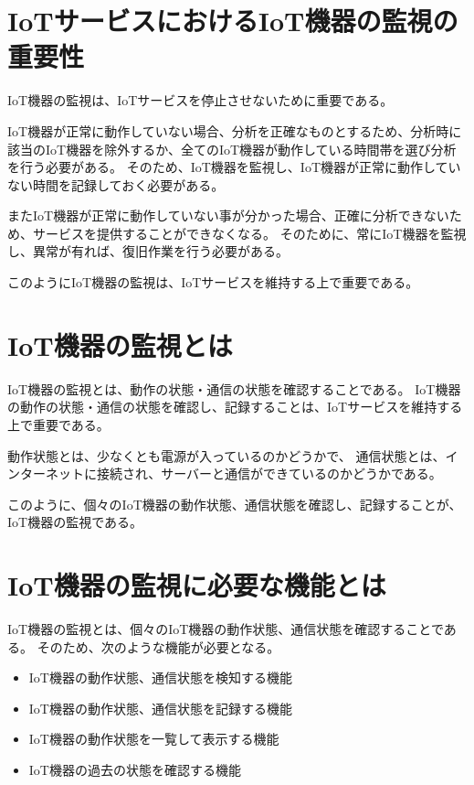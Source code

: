 \section{IoTサービスにおけるIoT機器の監視の重要性}
IoT機器の監視は、IoTサービスを停止させないために重要である。

IoT機器が正常に動作していない場合、分析を正確なものとするため、分析時に該当のIoT機器を除外するか、全てのIoT機器が動作している時間帯を選び分析を行う必要がある。
そのため、IoT機器を監視し、IoT機器が正常に動作していない時間を記録しておく必要がある。

またIoT機器が正常に動作していない事が分かった場合、正確に分析できないため、サービスを提供することができなくなる。
そのために、常にIoT機器を監視し、異常が有れば、復旧作業を行う必要がある。

このようにIoT機器の監視は、IoTサービスを維持する上で重要である。

\section{IoT機器の監視とは}%
IoT機器の監視とは、動作の状態・通信の状態を確認することである。
IoT機器の動作の状態・通信の状態を確認し、記録することは、IoTサービスを維持する上で重要である。

動作状態とは、少なくとも電源が入っているのかどうかで、
通信状態とは、インターネットに接続され、サーバーと通信ができているのかどうかである。
\medskip

このように、個々のIoT機器の動作状態、通信状態を確認し、記録することが、IoT機器の監視である。

\section{IoT機器の監視に必要な機能とは}%
IoT機器の監視とは、個々のIoT機器の動作状態、通信状態を確認することである。
そのため、次のような機能が必要となる。
\begin{itemize}
	\item IoT機器の動作状態、通信状態を検知する機能
	\item IoT機器の動作状態、通信状態を記録する機能
	\item IoT機器の動作状態を一覧して表示する機能
	\item IoT機器の過去の状態を確認する機能
\end{itemize}

